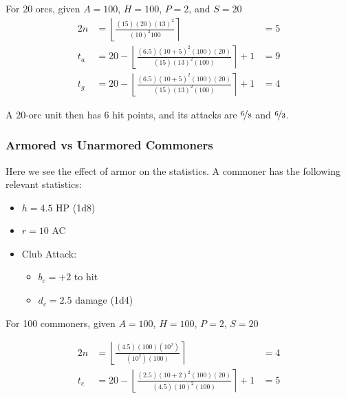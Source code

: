 \documentclass[twocolumn]{article}
\begin{document}
For 20 orcs, given $A = 100$, $H = 100$, $P = 2$, and $S = 20$
\begin{alignat*}{2}
    n   &=  
        \left\lfloor
            \frac
                {(15) (20) (13)^2}
                {(10)^2 100}
        \right\rceil
            &=  5
    \\
    t_a &=
        20 -
        \left\lfloor
            \frac
                {(6.5) (10 + 5)^2 (100) (20)}
                {(15) (13)^2 (100)}
        \right\rceil
        + 1 
            &=   9
    \\
    t_g &=  
        20 -
        \left\lfloor
            \frac
                {(6.5) (10 + 5)^2 (100) (20)}
                {(15) (13)^2 (100)}
        \right\rceil
        + 1
            &=  4
\end{alignat*}

A 20-orc unit then has 6 hit points, and its attacks are
$\nicefrac{6}{8}$ and $\nicefrac{6}{3}$.

\subsubsection{Armored vs Unarmored Commoners}

Here we see the effect of armor on the statistics.
A commoner has the following relevant statistics:

\begin{itemize}
    \item $h = 4.5$ HP (1d8)
    \item $r = 10$ AC
    \item Club Attack:
        \begin{itemize}
            \item $b_c = +2$ to hit
            \item $d_c = 2.5$ damage (1d4)
        \end{itemize}
\end{itemize}


For 100 commoners, given $A = 100$, $H = 100$, $P = 2$, $S = 20$

\begin{alignat*}{2}
    n   &=  
        \left\lfloor
            \frac
                {(4.5) (100) (10^2)}
                {(10^2) (100)}
        \right\rceil
            &= 4
    \\
    t_c &=
        20 -
        \left\lfloor
            \frac
                {(2.5) (10 + 2)^2 (100) (20)}
                {(4.5) (10)^2 (100)}
        \right\rceil
        + 1
            &= 5
\end{alignat*}
\end{document}

